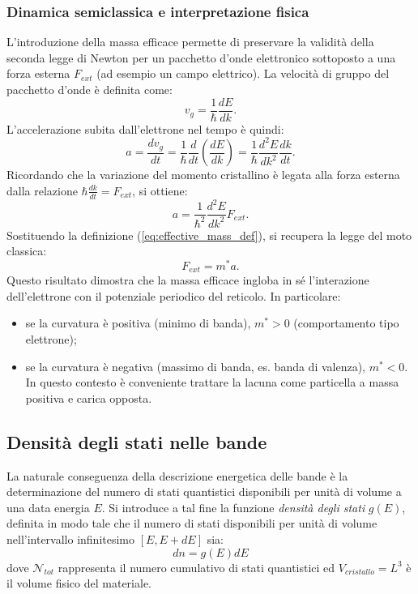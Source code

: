 \documentclass[a4paper,11pt]{report}
\begin{document}
\subsubsection{Dinamica semiclassica e interpretazione fisica}
L'introduzione della massa efficace permette di preservare la validità della seconda legge di Newton per un pacchetto d'onde elettronico sottoposto a una forza esterna $F_{ext}$ (ad esempio un campo elettrico).
La velocità di gruppo del pacchetto d'onde è definita come:
\begin{equation}
    v_g = \frac{1}{\hbar} \frac{dE}{dk}.
\end{equation}
L'accelerazione subita dall'elettrone nel tempo è quindi:
\begin{equation}
    a = \frac{dv_g}{dt} = \frac{1}{\hbar} \frac{d}{dt} \left( \frac{dE}{dk} \right) = \frac{1}{\hbar} \frac{d^2E}{dk^2} \frac{dk}{dt}.
\end{equation}
Ricordando che la variazione del momento cristallino è legata alla forza esterna dalla relazione $\hbar \frac{dk}{dt} = F_{ext}$, si ottiene:
\begin{equation}
    a = \frac{1}{\hbar^2} \frac{d^2E}{dk^2} F_{ext}.
\end{equation}
Sostituendo la definizione (\ref{eq:effective_mass_def}), si recupera la legge del moto classica:
\begin{equation}
    F_{ext} = m^* a.
\end{equation}
Questo risultato dimostra che la massa efficace ingloba in sé l'interazione dell'elettrone con il potenziale periodico del reticolo. In particolare:
\begin{itemize}
    \item se la curvatura è positiva (minimo di banda), $m^* > 0$ (comportamento tipo elettrone);
    \item se la curvatura è negativa (massimo di banda, es. banda di valenza), $m^* < 0$. In questo contesto è conveniente trattare la lacuna come particella a massa positiva e carica opposta.
\end{itemize}

\subsection{Densità degli stati nelle bande}

La naturale conseguenza della descrizione energetica delle bande è la determinazione del numero di stati quantistici disponibili per unità di volume a una data energia $E$. Si introduce a tal fine la funzione \textit{densità degli stati} $g(E)$, definita in modo tale che il numero di stati disponibili per unità di volume nell'intervallo infinitesimo $[E, E+dE]$ sia:
\begin{equation}
    dn = g(E) dE
\end{equation}
dove $\mathcal{N}_{tot}$ rappresenta il numero cumulativo di stati quantistici ed $V_{cristallo} = L^3$ è il volume fisico del materiale.
\end{document}
